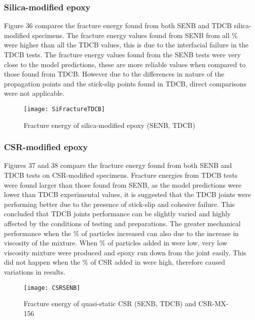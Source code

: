\documentclass[numbers=noendperiod,chapterprefix=on]{icldt} %
\begin{document}
\subsubsection{Silica-modified epoxy}
Figure 36 compares the fracture energy found from both SENB and TDCB silica-modified specimens. The fracture energy values found from SENB from all \% were higher than all the TDCB values, this is due to the interfacial failure in the TDCB tests. The fracture energy values found from the SENB tests were very close to the model predictions, these are more reliable values when compared to those found from TDCB. However due to the differences in nature of the propagation points and the stick-slip points found in TDCB, direct comparisons were not applicable. 

\begin{figure}[!htpb]
\centering
\texttt{[image: SiFractureTDCB]}
\caption{Fracture energy of silica-modified epoxy (SENB, TDCB) } %
\end{figure}
\FloatBarrier

\subsubsection{CSR-modified epoxy}
Figures 37 and 38 compare the fracture energy found from both SENB and TDCB tests on CSR-modified specimens. Fracture energies from TDCB tests were found larger than those found from SENB, as the model predictions were lower than TDCB experimental values, it is suggested that the TDCB joints were performing better due to the presence of stick-slip and cohesive failure. This concluded that TDCB joints performance can be slightly varied and highly affected by the conditions of testing and preparations. The greater mechanical performance when the \% of particles increased can also due to the increase in viscosity of the mixture. When \% of particles added in were low, very low viscosity mixture were produced and epoxy run down from the joint easily. This did not happen when the \% of CSR added in were high, therefore caused variations in results.

\begin{figure}[!htpb]
\centering
\texttt{[image: CSRSENB]}
\caption{Fracture energy of quasi-static CSR (SENB, TDCB) and CSR-MX-156} %
\end{figure}
\FloatBarrier
\end{document}
